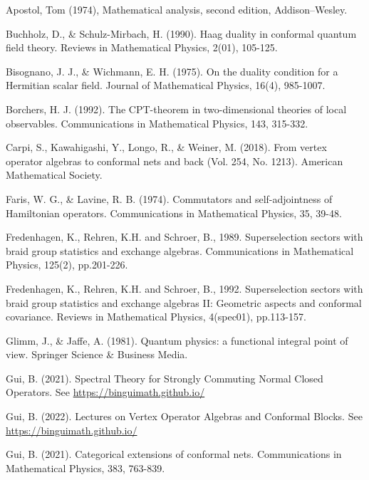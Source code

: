 \documentclass[12pt,b5paper,notitlepage]{article}
\theoremstyle{definition}
\theoremstyle{plain}
\numberwithin{equation}{section}
\begin{document}
\printindex


\begin{thebibliography}{999999}
\footnotesize	

Apostol, Tom (1974), Mathematical analysis, second edition, Addison–Wesley.


Buchholz, D., \& Schulz-Mirbach, H. (1990). Haag duality in conformal quantum field theory. Reviews in Mathematical Physics, 2(01), 105-125.

Bisognano, J. J., \& Wichmann, E. H. (1975). On the duality condition for a Hermitian scalar field. Journal of Mathematical Physics, 16(4), 985-1007.


Borchers, H. J. (1992). The CPT-theorem in two-dimensional theories of local observables. Communications in Mathematical Physics, 143, 315-332.


Carpi, S., Kawahigashi, Y., Longo, R., \& Weiner, M. (2018). From vertex operator algebras to conformal nets and back (Vol. 254, No. 1213). American Mathematical Society.


Faris, W. G., \& Lavine, R. B. (1974). Commutators and self-adjointness of Hamiltonian operators. Communications in Mathematical Physics, 35, 39-48.

Fredenhagen, K., Rehren, K.H. and Schroer, B., 1989. Superselection sectors with braid group statistics and exchange algebras. Communications in Mathematical Physics, 125(2), pp.201-226.


Fredenhagen, K., Rehren, K.H. and Schroer, B., 1992. Superselection sectors with braid group statistics and exchange algebras II: Geometric aspects and conformal covariance. Reviews in Mathematical Physics, 4(spec01), pp.113-157.


Glimm, J., \& Jaffe, A. (1981). Quantum physics: a functional integral point of view. Springer Science \& Business Media.


Gui, B. (2021). Spectral Theory for Strongly Commuting Normal Closed Operators. See \href{https://binguimath.github.io/}{https://binguimath.github.io/}

Gui, B. (2022). Lectures on Vertex Operator Algebras and Conformal Blocks. See \href{https://binguimath.github.io/}{https://binguimath.github.io/}

Gui, B. (2021). Categorical extensions of conformal nets. Communications in Mathematical Physics, 383, 763-839.



\end{thebibliography}
\end{document}

